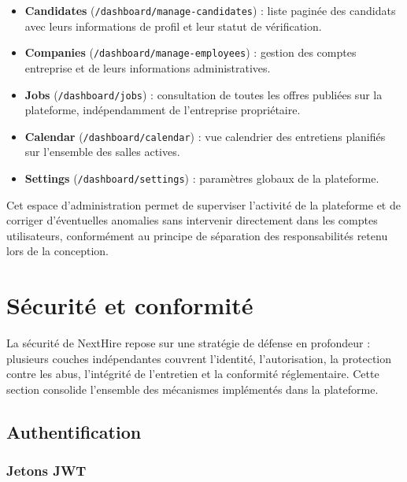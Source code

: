 \begin{itemize}
  \item \textbf{Candidates} (\texttt{/dashboard/manage-candidates}) : liste paginée des
        candidats avec leurs informations de profil et leur statut de vérification.
  \item \textbf{Companies} (\texttt{/dashboard/manage-employees}) : gestion des comptes
        entreprise et de leurs informations administratives.
  \item \textbf{Jobs} (\texttt{/dashboard/jobs}) : consultation de toutes les offres publiées
        sur la plateforme, indépendamment de l'entreprise propriétaire.
  \item \textbf{Calendar} (\texttt{/dashboard/calendar}) : vue calendrier des entretiens
        planifiés sur l'ensemble des salles actives.
  \item \textbf{Settings} (\texttt{/dashboard/settings}) : paramètres globaux de la
        plateforme.
\end{itemize}

Cet espace d'administration permet de superviser l'activité de la plateforme et de
corriger d'éventuelles anomalies sans intervenir directement dans les comptes utilisateurs,
conformément au principe de séparation des responsabilités retenu lors de la conception.

\section{Sécurité et conformité}

La sécurité de NextHire repose sur une stratégie de défense en profondeur : plusieurs couches
indépendantes couvrent l'identité, l'autorisation, la protection contre les abus, l'intégrité
de l'entretien et la conformité réglementaire. Cette section consolide l'ensemble des mécanismes
implémentés dans la plateforme.

\subsection{Authentification}

\subsubsection{Jetons JWT}

